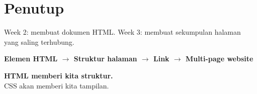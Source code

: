 \documentclass[11pt,a4paper]{article}
\begin{document}
\section{Penutup}
Week 2: membuat dokumen HTML. Week 3: membuat sekumpulan halaman yang saling terhubung.
\begin{center}\textbf{Elemen HTML $\rightarrow$ Struktur halaman $\rightarrow$ Link $\rightarrow$ Multi-page website}\end{center}
\begin{conceptbox}\centering\textbf{HTML memberi kita struktur.}\\CSS akan memberi kita tampilan.\end{conceptbox}
\end{document}
